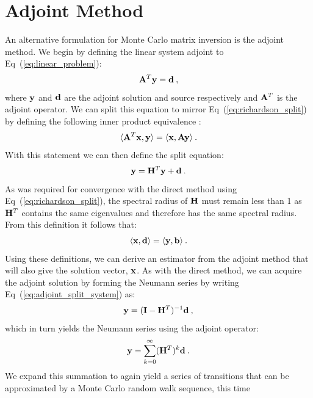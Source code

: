 \section{Adjoint Method}
\label{sec:adjoint_mc}
An alternative formulation for Monte Carlo matrix inversion is the
adjoint method. We begin by defining the linear system adjoint to
Eq~(\ref{eq:linear_problem}):
\begin{equation}
  \mathbf{A}^T \mathbf{y} = \mathbf{d}\:,
  \label{eq:adjoint_linear_problem}
\end{equation}
where $\mathbf{y}$ and $\mathbf{d}$ are the adjoint solution and source
respectively and $\mathbf{A}^T$ is the adjoint operator. We can split this
equation to mirror Eq~(\ref{eq:richardson_split}) by defining the
following inner product equivalence \citep{spanier_monte_1969}:
\begin{equation}
  \langle \mathbf{A}^T \mathbf{x}, \mathbf{y} \rangle = \langle \mathbf{x}, \mathbf{A}
  \mathbf{y} \rangle\:.
  \label{eq:adjoint_operator_product}
\end{equation}
With this statement we can then define the split equation:
\begin{equation}
  \mathbf{y} = \mathbf{H}^T \mathbf{y} + \mathbf{d}\:.
  \label{eq:adjoint_split_system}
\end{equation}
As was required for convergence with the direct method using
Eq~(\ref{eq:richardson_split}), the spectral radius of $\mathbf{H}$ must
remain less than 1 as $\mathbf{H}^T$ contains the same eigenvalues and
therefore has the same spectral radius. From this definition it
follows that:
\begin{equation}
  \langle \mathbf{x}, \mathbf{d} \rangle = \langle \mathbf{y}, \mathbf{b} \rangle\:.
  \label{eq:adjoint_vector_relation}
\end{equation}
Using these definitions, we can derive an estimator from the adjoint
method that will also give the solution vector, $\mathbf{x}$. As with the
direct method, we can acquire the adjoint solution by forming the
Neumann series by writing Eq~(\ref{eq:adjoint_split_system}) as:
\begin{equation}
  \mathbf{y} = (\mathbf{I} - \mathbf{H}^T)^{-1} \mathbf{d}\:,
  \label{eq:adjoint_split_system_2}
\end{equation}
which in turn yields the Neumann series using the adjoint operator:
\begin{equation}
  \mathbf{y} = \sum_{k=0}^{\infty} (\mathbf{H}^T)^k\mathbf{d}\:.
  \label{eq:adjoint_neumann_series}
\end{equation}
We expand this summation to again yield a series of transitions that
can be approximated by a Monte Carlo random walk sequence, this time
